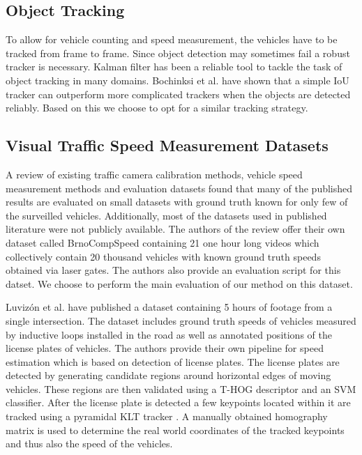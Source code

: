 \documentclass[twocolumn]{svjour3}          \smartqed  \usepackage{graphicx}
\begin{document}
\subsection{Object Tracking}

To allow for vehicle counting and speed measurement, the vehicles have to be tracked from frame to frame. Since object detection may sometimes fail a robust tracker is necessary. Kalman filter \cite{Kalman} has been a reliable tool to tackle the task of object tracking in many domains. Bochinksi et al. \cite{IOU} have shown that a simple IoU tracker can outperform more complicated trackers when the objects are detected reliably. Based on this we choose to opt for a similar tracking strategy.

\subsection{Visual Traffic Speed Measurement Datasets}

A review \cite{brnocompspeed} of existing traffic camera calibration methods, vehicle speed measurement methods and evaluation datasets found that many of the published results are evaluated on small datasets with ground truth known for only few of the surveilled vehicles. Additionally, most of the datasets used in published literature were not publicly available. The authors of the review offer their own dataset called BrnoCompSpeed containing 21 one hour long videos which collectively contain 20 thousand vehicles with known ground truth speeds obtained via laser gates. The authors also provide an evaluation script for this datset. We choose to perform the main evaluation of our method on this dataset.

Luviz\'{o}n et al. \cite{luvizon} have published a dataset containing 5 hours of footage from a single intersection. The dataset includes ground truth speeds of vehicles measured by inductive loops installed in the road as well as annotated positions of the license plates of vehicles. The authors provide their own pipeline for speed estimation which is based on detection of license plates. The license plates are detected by generating candidate regions around horizontal edges of moving vehicles. These regions are then validated using a T-HOG \cite{thog} descriptor and an SVM classifier. After the license plate is detected a few keypoints located within it are tracked using a pyramidal KLT tracker \cite{pKLT}. A manually obtained homography matrix is used to determine the real world coordinates of the tracked keypoints and thus also the speed of the vehicles.
\end{document}
